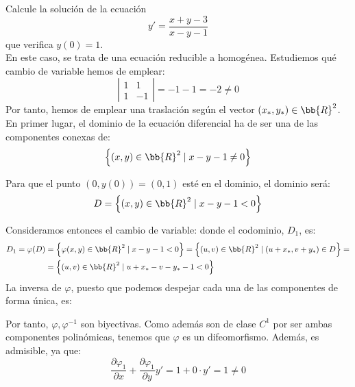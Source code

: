 \begin{ejercicio}
    Calcule la solución de la ecuación
    \begin{equation*}
        y' = \dfrac{x + y - 3}{x - y - 1}
    \end{equation*}
    que verifica $y(0) = 1$.\\

    En este caso, se trata de una ecuación reducible a homogénea.
    Estudiemos qué cambio de variable hemos de emplear:
    \begin{equation*}
        \left|\begin{array}{cc}
            1 & 1\\
            1 & -1
        \end{array}\right| = -1-1=-2\neq 0
    \end{equation*}
    Por tanto, hemos de emplear una traslación según el vector $(x_\ast,y_\ast)\in \bb{R}^2$.
    En primer lugar, el dominio de la ecuación diferencial ha de ser una de las componentes conexas de:
    \begin{equation*}
        \left\{(x,y)\in \bb{R}^2 \mid x-y-1\neq 0\right\}
    \end{equation*}

    Para que el punto $(0,y(0))=(0,1)$ esté en el dominio, el dominio será:
    \begin{equation*}
        D=\left\{(x,y)\in \bb{R}^2 \mid x-y-1< 0\right\}
    \end{equation*}

    Consideramos entonces el cambio de variable:
    donde el codominio, $D_1$, es:
    \begin{align*}
        D_1=\varphi(D)&=\left\{\varphi(x,y)\in \bb{R}^2 \mid x-y-1< 0\right\} = \left\{(u,v)\in \bb{R}^2 \mid (u+x_\ast, v+y_\ast)\in D\right\} =\\
        &= \left\{(u,v)\in \bb{R}^2 \mid u+x_\ast - v-y_\ast-1<0\right\}
    \end{align*}
    La inversa de $\varphi$, puesto que podemos despejar cada una de las componentes de forma única, es:

    Por tanto, $\varphi, \varphi^{-1}$ son biyectivas. Como además son de clase $C^1$ por ser ambas componentes polinómicas, tenemos que $\varphi$ es un difeomorfismo. Además, es admisible, ya que:
    \begin{equation*}
        \dfrac{\partial \varphi_1}{\partial x} + \dfrac{\partial \varphi_1}{\partial y} y' = 1 + 0\cdot y'=1 \neq 0
    \end{equation*}


\end{ejercicio}
